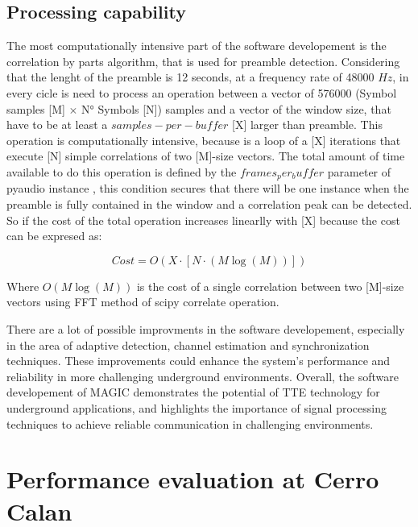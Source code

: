 \subsection{Processing capability}

The most computationally intensive part of the software developement is the correlation by parts algorithm, that is used for preamble detection. Considering that the lenght of the preamble is 12 seconds, at a frequency rate of 48000 $Hz$, in every cicle is need to process an operation between a vector of 576000  (Symbol samples [M] $\times$ N° Symbols [N]) samples and a vector of the window size, that have to be at least a $samples-per-buffer$ [X] larger than preamble. This operation is computationally intensive, because is a loop of a [X] iterations that execute [N] simple correlations of two [M]-size vectors. The total amount of time available to do this operation is defined by the $frames_per_buffer$ parameter of pyaudio instance \cite{mitPyAudioDocumentation}, this condition secures that there will be one instance when the preamble is fully contained in the window and a correlation peak can be detected. 
\newp
So if the cost of the total operation increases linearlly with [X] because the cost can be expresed as:

\begin{equation}
    Cost = O(X \cdot [N \cdot (M\log(M))])
    \end{equation}

Where $O(M\log(M))$ is the cost of a single correlation between two [M]-size vectors using FFT method of scipy correlate operation.





\newp
There are a lot of possible improvments in the software developement, especially in the area of adaptive detection, channel estimation and synchronization techniques. These improvements could enhance the system's performance and reliability in more challenging underground environments.
\newp
Overall, the software developement of MAGIC demonstrates the potential of TTE technology for underground applications, and highlights the importance of signal processing techniques to achieve reliable communication in challenging environments. 


\section{Performance evaluation at Cerro Calan}\label{subsec: Performance evaluation at Cerro Calan}


